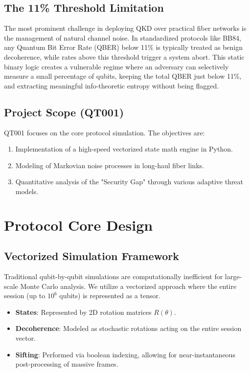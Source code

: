 \documentclass[journal,onecolumn,12pt,draftclsnofoot]{IEEEtran}
\begin{document}
\subsection{The 11\% Threshold Limitation}
The most prominent challenge in deploying QKD over practical fiber networks is the management of natural channel noise. In standardized protocols like BB84, any Quantum Bit Error Rate (QBER) below 11\% is typically treated as benign decoherence, while rates above this threshold trigger a system abort. This static binary logic creates a vulnerable regime where an adversary can selectively measure a small percentage of qubits, keeping the total QBER just below 11\%, and extracting meaningful info-theoretic entropy without being flagged.

\subsection{Project Scope (QT001)}
QT001 focuses on the core protocol simulation. The objectives are:
\begin{enumerate}
    \item Implementation of a high-speed vectorized state math engine in Python.
    \item Modeling of Markovian noise processes in long-haul fiber links.
    \item Quantitative analysis of the "Security Gap" through various adaptive threat models.
\end{enumerate}

\newpage

\section{Protocol Core Design}

\subsection{Vectorized Simulation Framework}
Traditional qubit-by-qubit simulations are computationally inefficient for large-scale Monte Carlo analysis. We utilize a vectorized approach where the entire session (up to $10^6$ qubits) is represented as a tensor.
\begin{itemize}
    \item \textbf{States}: Represented by 2D rotation matrices $R(\theta)$.
    \item \textbf{Decoherence}: Modeled as stochastic rotations acting on the entire session vector.
    \item \textbf{Sifting}: Performed via boolean indexing, allowing for near-instantaneous post-processing of massive frames.
\end{itemize}
\end{document}
